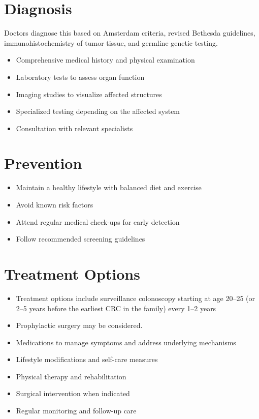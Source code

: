 \section{Diagnosis}
Doctors diagnose this based on Amsterdam criteria, revised Bethesda guidelines, immunohistochemistry of tumor tissue, and germline genetic testing.

\begin{itemize}[noitemsep]
  \item Comprehensive medical history and physical examination
  \item Laboratory tests to assess organ function
  \item Imaging studies to visualize affected structures
  \item Specialized testing depending on the affected system
  \item Consultation with relevant specialists
\end{itemize}
\section{Prevention}
\begin{itemize}[noitemsep]
  \item Maintain a healthy lifestyle with balanced diet and exercise
  \item Avoid known risk factors
  \item Attend regular medical check-ups for early detection
  \item Follow recommended screening guidelines
\end{itemize}
\section{Treatment Options}
\begin{itemize}[noitemsep]
  \item Treatment options include surveillance colonoscopy starting at age 20--25 (or 2--5 years before the earliest CRC in the family) every 1--2 years
  \item Prophylactic surgery may be considered.
  \item Medications to manage symptoms and address underlying mechanisms
  \item Lifestyle modifications and self-care measures
  \item Physical therapy and rehabilitation
  \item Surgical intervention when indicated
  \item Regular monitoring and follow-up care
\end{itemize}
